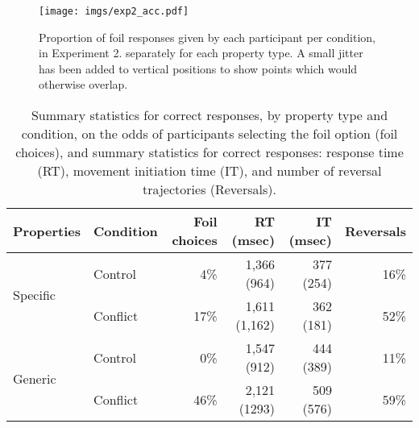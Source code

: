 \begin{figure}[ht]
  \centering
  \texttt{[image: imgs/exp2\_acc.pdf]}
  \caption[Proportion of foil responses given by each participant, per condition, in Experiment 2.]{
    Proportion of foil responses given by each participant per condition, in Experiment 2.
    separately for each property type.
    A small jitter has been added to vertical positions
    to show points which would otherwise overlap.
    \label{fig:exp2_acc} }
\end{figure}


\begin{table}
  \centering
  \begin{tabular}{llrrrr}
   \toprule
    Properties                & Condition & Foil choices &  RT (msec)    & IT (msec) &  Reversals\\
    \midrule
    \multirow{2}{*}{Specific} & Control   &   4\%        &  1,366 (964)  & 377 (254) &  16\%\\
                              & Conflict  &   17\%       & 1,611 (1,162) & 362 (181) &  52\%\\
    \multirow{2}{*}{Generic}  & Control   &  0\%         &  1,547 (912)  & 444 (389) &  11\%\\
                              & Conflict  &   46\%       &  2,121 (1293) & 509 (576) &  59\%\\
    \bottomrule
  \end{tabular}
  \caption[Descriptive statistics for correct responses, Experiment 2.]{
    Summary statistics for correct responses, by property type and condition,
    on the odds of participants selecting the foil option (foil choices),
    and summary statistics for correct responses: response time (RT),
    movement initiation time (IT),
    and number of reversal trajectories (Reversals).
    \label{tab:exp2_descriptive}
  }
\end{table}


